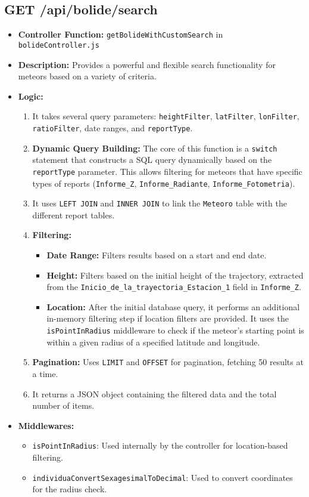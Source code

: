 \documentclass{article}
\begin{document}
\subsection{GET /api/bolide/search}
\begin{itemize}
    \item \textbf{Controller Function:} \texttt{getBolideWithCustomSearch} in \texttt{bolideController.js}
    \item \textbf{Description:} Provides a powerful and flexible search functionality for meteors based on a variety of criteria.
    \item \textbf{Logic:}
    \begin{enumerate}
        \item It takes several query parameters: \texttt{heightFilter}, \texttt{latFilter}, \texttt{lonFilter}, \texttt{ratioFilter}, date ranges, and \texttt{reportType}.
        \item \textbf{Dynamic Query Building:} The core of this function is a \texttt{switch} statement that constructs a SQL query dynamically based on the \texttt{reportType} parameter. This allows filtering for meteors that have specific types of reports (\texttt{Informe\_Z}, \texttt{Informe\_Radiante}, \texttt{Informe\_Fotometria}).
        \item It uses \texttt{LEFT JOIN} and \texttt{INNER JOIN} to link the \texttt{Meteoro} table with the different report tables.
        \item \textbf{Filtering:}
        \begin{itemize}
            \item \textbf{Date Range:} Filters results based on a start and end date.
            \item \textbf{Height:} Filters based on the initial height of the trajectory, extracted from the \texttt{Inicio\_de\_la\_trayectoria\_Estacion\_1} field in \texttt{Informe\_Z}.
            \item \textbf{Location:} After the initial database query, it performs an additional in-memory filtering step if location filters are provided. It uses the \texttt{isPointInRadius} middleware to check if the meteor's starting point is within a given radius of a specified latitude and longitude.
        \end{itemize}
        \item \textbf{Pagination:} Uses \texttt{LIMIT} and \texttt{OFFSET} for pagination, fetching 50 results at a time.
        \item It returns a JSON object containing the filtered data and the total number of items.
    \end{enumerate}
    \item \textbf{Middlewares:}
    \begin{itemize}
        \item \texttt{isPointInRadius}: Used internally by the controller for location-based filtering.
        \item \texttt{individuaConvertSexagesimalToDecimal}: Used to convert coordinates for the radius check.
    \end{itemize}
\end{itemize}
\end{document}
